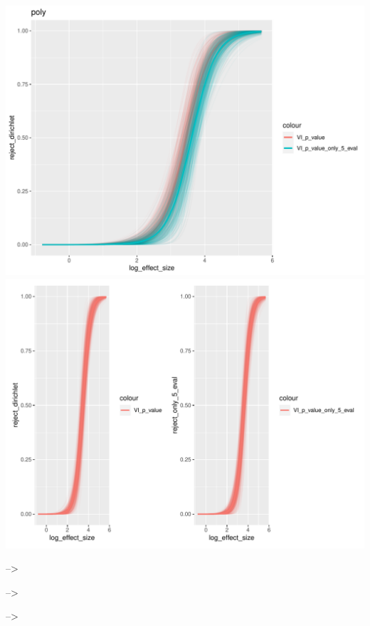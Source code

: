 \documentclass[]{interact}
\theoremstyle{plain}%
\theoremstyle{definition}
\theoremstyle{remark}
\begin{document}
\includegraphics[width=1\linewidth]{paper_comparison_files/figure-latex/unnamed-chunk-12-1}
\includegraphics[width=1\linewidth]{paper_comparison_files/figure-latex/unnamed-chunk-12-2}

--\textgreater{}

--\textgreater{}

--\textgreater{}



\end{document}
